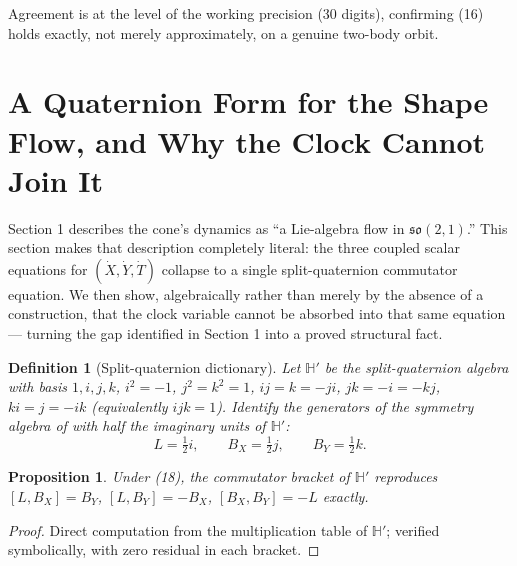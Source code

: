 \documentclass[12pt]{amsart}
\theoremstyle{plain}
\newtheorem{proposition}[theorem]{Proposition}
\newtheorem{definition}[theorem]{Definition}
\theoremstyle{remark}
\begin{document}
Agreement is at the level of the working precision (30 digits), confirming (16) holds exactly, not merely approximately, on a genuine two-body orbit.

\section{A Quaternion Form for the Shape Flow, and Why the Clock Cannot Join It}

Section 1 describes the cone's dynamics as ``a Lie-algebra flow in $\mathfrak{so}(2,1)$.'' This section makes that description completely literal: the three coupled scalar equations for $(\dot X,\dot Y,\dot T)$ collapse to a single split-quaternion commutator equation. We then show, algebraically rather than merely by the absence of a construction, that the clock variable cannot be absorbed into that same equation --- turning the gap identified in Section 1 into a proved structural fact.

\begin{definition}[Split-quaternion dictionary]
Let $\mathbb H'$ be the split-quaternion algebra with basis $1,i,j,k$, $i^2=-1$, $j^2=k^2=1$, $ij=k=-ji$, $jk=-i=-kj$, $ki=j=-ik$ (equivalently $ijk=1$). Identify the generators of the symmetry algebra of \cite{Ebert2026EigenCoord} with half the imaginary units of $\mathbb H'$:
\begin{equation}
L=\tfrac12 i,\qquad B_X=\tfrac12 j,\qquad B_Y=\tfrac12 k. \tag{18}
\end{equation}
\end{definition}

\begin{proposition}
Under (18), the commutator bracket of $\mathbb H'$ reproduces $[L,B_X]=B_Y$, $[L,B_Y]=-B_X$, $[B_X,B_Y]=-L$ exactly.
\end{proposition}

\begin{proof}
Direct computation from the multiplication table of $\mathbb H'$; verified symbolically, with zero residual in each bracket.
\end{proof}
\end{document}
